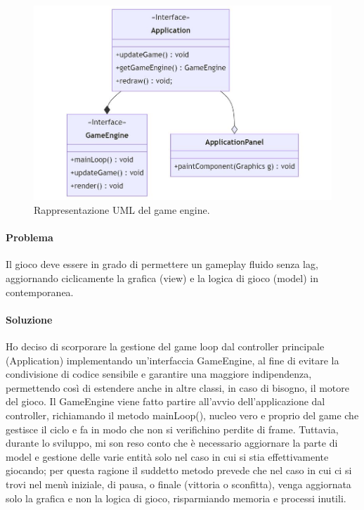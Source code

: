 \documentclass[a4paper,12pt]{report}
\begin{document}
\begin{figure}[H]
\centering{}
\includegraphics[width=\textwidth]{img/gameloop.jpg}
\caption{Rappresentazione UML del game engine.}
\end{figure}

\paragraph{Problema} Il gioco deve essere in grado di permettere un gameplay fluido senza lag, aggiornando ciclicamente la grafica (view) e la logica di gioco (model) in contemporanea.

\paragraph{Soluzione} Ho deciso di scorporare la gestione del game loop dal controller principale (Application) implementando un’interfaccia GameEngine, al fine di evitare la condivisione di codice sensibile e garantire una maggiore indipendenza, permettendo così di estendere anche in altre classi, in caso di bisogno, il motore del gioco. Il GameEngine viene fatto partire all’avvio dell’applicazione dal controller, richiamando il metodo mainLoop(), nucleo vero e proprio del game che gestisce il ciclo e fa in modo che non si verifichino perdite di frame. Tuttavia, durante lo sviluppo, mi son reso conto che è necessario aggiornare la parte di model e gestione delle varie entità solo nel caso in cui si stia effettivamente giocando; per questa ragione il suddetto metodo prevede che nel caso in cui ci si trovi nel menù iniziale, di pausa, o finale (vittoria o sconfitta), venga aggiornata solo la grafica e non la logica di gioco, risparmiando memoria e processi inutili.
\end{document}
